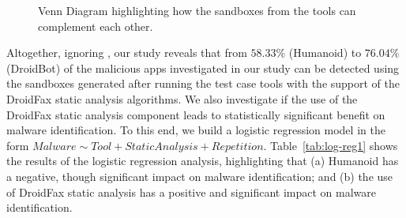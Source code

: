 \begin{figure}[htb]
  \caption{Venn Diagram highlighting how the sandboxes from the tools can
    complement each other.}
  \label{fig:venn-plot1}
\end{figure}


Altogether, ignoring  \joke, our study reveals that from $58.33$\% (Humanoid)
to $76.04$\% (DroidBot) of the malicious apps investigated in our study can be
detected using the sandboxes generated after running the test case tools with the support of the
DroidFax static analysis algorithms. {\color{red}We also investigate if the use
  of the DroidFax static analysis component leads to statistically significant benefit
  on malware identification. To this end, we build a logistic regression model
in the form $Malware \sim Tool + StaticAnalysis + Repetition$. Table~\ref{tab:log-reg1}
shows the results of the logistic regression analysis, highlighting that
(a) Humanoid has a negative, though significant impact on malware identification; and
(b) the use of DroidFax static analysis has a positive and significant
impact on malware identification.}

